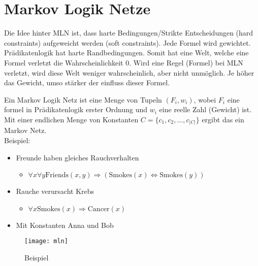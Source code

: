 \chapter{Markov Logik Netze}

Die Idee hinter MLN ist, dass harte Bedingungen/Strikte Entscheidungen (hard
constraints) aufgeweicht werden (soft constraints). Jede Formel wird
gewichtet. \\Prädikatenlogik hat harte Randbedingungen. Somit hat eine Welt,
welche eine Formel verletzt die Wahrscheinlichkeit 0.
Wird eine Regel (Formel) bei MLN verletzt, wird diese Welt
weniger wahrscheinlich, aber nicht unmöglich. Je höher das Gewicht, umso
stärker der einfluss dieser Formel.

Ein Markov Logik Netz ist eine Menge von Tupeln $(F_i,w_i)$, wobei
$F_i$ eine formel in Prädikatenlogik erster Ordnung und $w_i$ eine
reelle Zahl (Gewicht) ist. \\
Mit einer endlichen Menge von Konstanten $C = \{c_1,c_2,\dots,c_{|C|}\}$ ergibt
das ein Markov Netz.\\

Beispiel:
\begin{itemize}
    \item Freunde haben gleiches Rauchverhalten
    \begin{itemize}
        \item $\forall x \forall y \text{Friends}(x,y) \Rightarrow (\text{Smokes}
        (x)\Leftrightarrow \text{Smokes}(y))$
    \end{itemize}
    \item Rauche verursacht Krebs
    \begin{itemize}
        \item $\forall x \text{Smokes}(x) \Rightarrow \text{Cancer}(x)$
    \end{itemize}
    \item Mit Konstanten Anna und Bob
\end{itemize}

\begin{figure}[!h]
  \centering
  \texttt{[image: mln]}
  \caption{Beispiel}
\end{figure}

